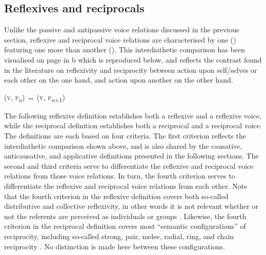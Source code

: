 \subsection{Reflexives and reciprocals} \label{def:reflexives-reciprocals}
Unlike the passive and antipassive voice relations discussed in the previous section, reflexive and reciprocal voice relations are characterised by one  () featuring one  more than another  (). This interdiathetic comparison has been visualised on page \pageref{fig:ch2:diathetic-relations} in b which is reproduced below, and reflects the contrast found in the literature on reflexivity and reciprocity between action upon self/selves or each other on the one hand, and action upon another  on the other hand.

\ea
	 (\textsc{v}, \textsc{p}\textsubscript{\textit{n}}) ↔  (\textsc{v}, \textsc{p}\textsubscript{\textit{n}+1})
\z

The following reflexive definition establishes both a reflexive  and a reflexive voice, while the reciprocal definition establishes both a reciprocal  and a reciprocal voice. The definitions are each based on four criteria. The first criterion reflects the interdiathetic comparison shown above, and is also shared by the causative, anticausative, and applicative definitions presented in the following sections. The second and third criteria serve to differentiate the reflexive and reciprocal voice relations from those voice relations. In turn, the fourth criterion serves to differentiate the reflexive and reciprocal voice relations from each other. Note that the fourth criterion in the reflexive definition covers both so-called distributive and collective reflexivity, in other words it is not relevant whether or not the referents are perceived as individuals or groups \citep[159ff.]{zuniga:kittila:2019}. Likewise, the fourth criterion in the reciprocal definition covers most “semantic configurations” of reciprocity, including so-called strong, pair, melee, radial, ring, and chain reciprocity \citep{majid:al:2011, evans:al:2011}. No distinction is made here between these configurations. 

